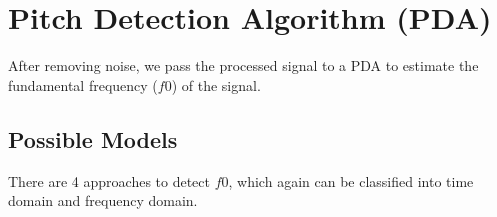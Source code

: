 \section{Pitch Detection Algorithm (PDA)}
After removing noise, we pass the processed signal to a PDA to estimate the fundamental frequency ($f0$) of
the signal.

\subsection{Possible Models}
There are 4 approaches to detect $f0$, which again can be classified into time domain and frequency domain.

